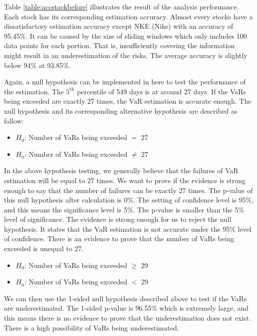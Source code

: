\documentclass[11pt]{article} %
\theoremstyle{plain}
\theoremstyle{definition}
\begin{document}
Table \ref{table:accstockbefore} illustrates the result of the analysis performance. Each stock has its corresponding estimation accuracy. Almost every stocks have a dissatisfactory estimation accuracy except NKE (Nike) with an accuracy of 95.45\%. It can be caused by the size of sliding windows which only includes 100 data points for each portion. That is, insufficiently covering the information might result in an underestimation of the risks. The average accuracy is slightly below 94\% at 93.85\%.

Again, a null hypothesis can be implemented in here to test the performance of the estimation. The $5^{\mathrm{th}}$ percentile of 549 days is at around 27 days. If the VaRs being exceeded are exactly 27 times, the VaR estimation is accurate enough. The null hypothesis and its corresponding alternative hypothesis are described as follow:

\begin{itemize}
    \item \textsl{$H_0$}: Number of VaRs being exceeded $=$ 27
    \item \textsl{$H_a$}: Number of VaRs being exceeded $\neq$ 27
\end{itemize}

In the above hypothesis testing, we generally believe that the failures of VaR estimation will be equal to 27 times. We want to prove if the evidence is strong enough to say that the number of failures can be exactly 27 times. The p-value of this null hypothesis after calculation is 0\%. The setting of confidence level is 95\%, and this means the significance level is 5\%. The p-value is smaller than the 5\% level of significance. The evidence is strong enough for us to reject the null hypothesis. It states that the VaR estimation is not accurate under the 95\% level of confidence. There is an evidence to prove that the number of VaRs being exceeded is unequal to 27.

\begin{itemize}
    \item \textsl{$H_0$}: Number of VaRs being exceeded $\geq$ 29
    \item \textsl{$H_a$}: Number of VaRs being exceeded $<$ 29
\end{itemize}

We can then use the 1-sided null hypothesis described above to test if the VaRs are underestimated. The 1-sided p-value is 96.55\% which is extremely large, and this means there is no evidence to prove that the underestimation does not exist. There is a high possibility of VaRs being underestimated.
\end{document}

